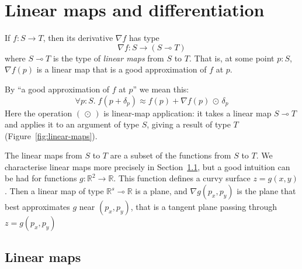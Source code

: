 \documentclass[sigplan,review]{acmart}
\renewcommand{\to}{\rightarrow}    %
\newcommand{\linto}{\multimap}     %
\newcommand{\gradf}[1]{\nabla\! #1}  %
\renewcommand{\d}[1]{\delta_{\mathit{#1}}}   %
\newcommand{\real}{\mathbb{R}}       %
\newcommand{\lmcomp}{\,\circ\,}   %
\newcommand{\lmapply}{\,\odot\,}      %
\newcommand{\simon}[1]{}
\begin{document}
\simon{Do we need scan?  Or (specialising to $(+)$) cumulative sum?}

\section{Linear maps and differentiation}

If $f : S \to T$, then its derivative $\gradf{f}$ has type
$$\gradf{f} : S \to (S \linto T)$$
where $S \linto T$ is the type of \emph{linear maps} from $S$ to $T$.
That is, at some point $p:S$, $\gradf{f}(p)$ is a linear map
that is a good approximation of $f$ at $p$.

By ``a good approximation of $f$ at $p$'' we mean this:
$$
\forall p:S.\; f( p + \d{p} ) \approx f(p) + \gradf{f}(p) \lmapply \d{p}
$$
Here the operation $(\lmapply)$ is linear-map application: it takes a
linear map $S \linto T$ and applies it to an argument of type $S$,
giving a result of type $T$ (Figure~\ref{fig:linear-maps}).

The linear maps from $S$ to $T$ are a subset of the
functions from $S$ to $T$.  We characterise linear maps more precisely
in Section~\ref{sec:lin-maps}, but
a good intuition can be had for functions $g : \real^2 \to \real$.
This function defines a curvy surface $z = g(x,y)$.  Then a linear map
of type $\real^s \linto \real$ is a plane, and $\gradf{g}(p_x,p_y)$ is
the plane that best approximates $g$ near $(p_x,p_y)$, that is a tangent plane
passing through $z = g(p_x, p_y)$

\subsection{Linear maps} \label{sec:lin-maps}
\end{document}
